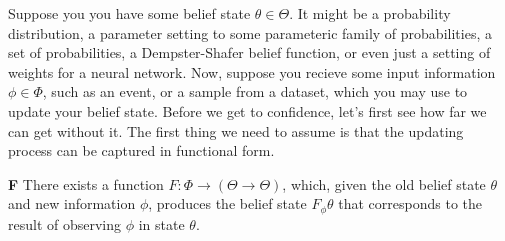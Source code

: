 \documentclass{article}
\begin{document}
Suppose you you have some belief state $\theta \in \Theta$. 
It might be 
a probability distribution, a parameter setting to some parameteric family of probabilities, a set of probabilities, a Dempster-Shafer belief function, or even just a setting of weights for a neural network. 
Now, suppose you recieve some input information $\phi \in \Phi$, such as an event, or a sample from a dataset, which you may use to update your belief state. 
%
Before we get to confidence, let's first see how far we can get without it.
The first thing we need to assume is that the updating process can be captured in functional form. 
\begin{CFaxioms}
    \item[\textbf{F}] 
        There exists a function
        $F : \Phi \to ( \Theta \to \Theta)$,
        which, given the old belief state $\theta$ and new information $\phi$, produces the belief state $F_\phi\theta$ that corresponds to the result of observing $\phi$ in state $\theta$.
\end{CFaxioms}
\end{document}
